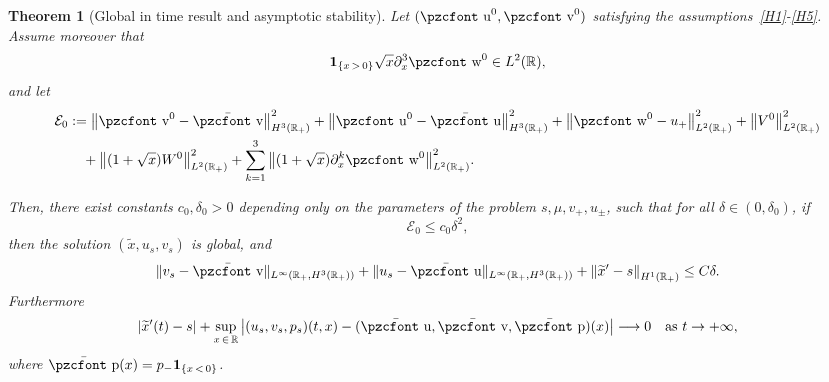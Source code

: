 \documentclass[10pt]{amsart}
\newtheorem{theo}{Theorem}[section]
\theoremstyle{definition}\newtheorem{defi}[theo]{Definition}\newtheorem{rema}[theo]{Remark}\newtheorem{exam}[theo]{Example}\newtheorem{exem}[theo]{Example}\newtheorem{nota}[theo]{Notation}
\newcommand{\mathpzc}[1]{\text{\pzcfont #1}}
\newcommand{\R}{\mathbb{R}}
\newcommand{\p}{\partial}
\newcommand{\bv}{\bar{\mathpzc{v}}}
\newcommand{\bu}{\bar{\mathpzc{u}}}
\newcommand{\bp}{\bar{\mathpzc{p}}}
\newcommand{\bfun}{\mathbf{1}}
\newcommand{\cE}{\mathcal E}
\newcommand{\tv}{\mathpzc{v}}
\newcommand{\tu}{\mathpzc{u}}
\newcommand{\tw}{\mathpzc{w}}
\newcommand{\tx}{\widetilde{x}}
\begin{document}
\begin{theo}[Global in time result and asymptotic stability]\label{thm:main-glob}
Let $(\tu^0, \tv^0)$ satisfying the assumptions~\eqref{H1}-\eqref{H5}. Assume moreover that
\begin{equation}
\bfun_{\{x\, >\,0\}} \sqrt{x} \partial^3_x \tw^0 \in L^2(\R),
\end{equation}
and let
\begin{align*}
\cE_0 & :=\left\|\tv^0 - \bv\right\|_{H^3(\R_+)}^2 + \left\|\tu^0-\bu\right\|_{H^3(\R_+)}^2 +\left\|\tw^0 - u_+\right\|_{L^2(\R_+)}^2 +\left\|V^0\right\|_{L^2(\R_+)}^2 \\
& \quad+ \left\|(1+\sqrt{x}) W^0\right\|_{L^2(\R_+)}^2+{
\sum_{k=1}^3 \left\|(1+\sqrt{x}) \p_x^k\tw^0\right\|_{L^2(\R_+)}^2}.
\end{align*}


Then, there exist constants $c_0,\delta_0 >0$ depending only on the parameters of the problem $s, \mu, v_+,u_\pm$, such that for all $\delta \in (0,\delta_0)$, if
\begin{equation}\label{hyp:small-glob}
\cE_0 \leq c_0 \delta^2,
\end{equation}
then the solution $(\tx,u_s,v_s)$ is global, and
\[
\|v_s-\bv\|_{L^\infty(\R_+, H^3(\R_+))} + \|u_s-\bu\|_{L^\infty(\R_+, H^3(\R_+))} +\left\|\tx'-s\right\|_{H^1(\R_+)}\leq C \delta.
\]
Furthermore
\begin{equation}
\left|\tx'(t) -s\right| + \sup_{x\,\in\,\R} \left|(u_s,v_s,p_s)(t,x) - (\bu, \bv,\bp)(x)\right| \longrightarrow 0 \quad \text{as}~t\to +\infty,
\end{equation}
where $\bp(x) = p_- \bfun_{\{x\,<\,0\}}$.
\end{theo}
\end{document}
